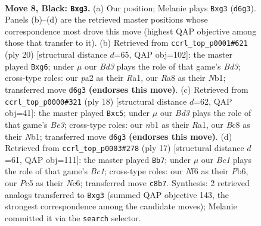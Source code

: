 \documentclass[11pt]{article}
\begin{document}
\begin{figure}[p]\centering
\begin{subfigure}{0.46\textwidth}\centering
\resizebox{\linewidth}{!}{%
\newchessgame
\chessboard[
  setfen={rnbq1rk1/p4ppp/1p1bpn2/2pp4/3P4/2PBPNB1/PP3PPP/RN1Q1RK1 b - - 0 8},
  showmover=false,
  pgfstyle=straightmove, color=movearrow, markmove={d6-g3}
]}
\caption{}
\end{subfigure}\hfill
\begin{subfigure}{0.46\textwidth}\centering
\resizebox{\linewidth}{!}{%
\newchessgame
\chessboard[
  setfen={r2q1rk1/pp1n1pp1/2pbpnbp/3p4/2PP4/1P1BPN2/PB3PPP/RN1Q1RK1 w - - 4 11},
  showmover=false,
  pgfstyle=straightmove, color=movearrow, markmove={d3-g6}
]}
\caption{}
\end{subfigure}
\\[4pt]
\begin{subfigure}{0.46\textwidth}\centering
\resizebox{\linewidth}{!}{%
\newchessgame
\chessboard[
  setfen={r1bqr1k1/1pp2ppp/2np1n2/2b1p3/p3P3/2PPBNP1/PP2QPBP/RN3RK1 w - - 1 10},
  showmover=false,
  pgfstyle=straightmove, color=movearrow, markmove={e3-c5}
]}
\caption{}
\end{subfigure}\hfill
\begin{subfigure}{0.46\textwidth}\centering
\resizebox{\linewidth}{!}{%
\newchessgame
\chessboard[
  setfen={r1bq1rk1/p4ppp/1pnbpn2/2pp4/3P4/2PBPNB1/PP1N1PPP/R2Q1RK1 b - - 1 9},
  showmover=false,
  pgfstyle=straightmove, color=movearrow, markmove={c8-b7}
]}
\caption{}
\end{subfigure}
\caption{\textbf{Move 8, Black: \texttt{Bxg3}.} (a) Our position; Melanie plays \texttt{Bxg3} (\texttt{d6g3}). Panels (b)--(d) are the retrieved master positions whose correspondence most drove this move (highest QAP objective among those that transfer to it). (b) Retrieved from \texttt{ccrl\_top\_p0001\#621} (ply 20) [structural distance $d$=65, QAP obj=102]: the master played \texttt{Bxg6}; under $\mu$ our \emph{Bd3} plays the role of that game's \emph{Bd3}; cross-type roles: our \emph{p}a2 as their \emph{R}a1, our \emph{R}a8 as their \emph{N}b1; transferred move \texttt{d6g3} \textbf{(endorses this move)}. (c) Retrieved from \texttt{ccrl\_top\_p0000\#321} (ply 18) [structural distance $d$=62, QAP obj=41]: the master played \texttt{Bxc5}; under $\mu$ our \emph{Bd3} plays the role of that game's \emph{Be3}; cross-type roles: our \emph{n}b1 as their \emph{R}a1, our \emph{B}c8 as their \emph{N}b1; transferred move \texttt{d6g3} \textbf{(endorses this move)}. (d) Retrieved from \texttt{ccrl\_top\_p0003\#278} (ply 17) [structural distance $d$=61, QAP obj=111]: the master played \texttt{Bb7}; under $\mu$ our \emph{Bc1} plays the role of that game's \emph{Bc1}; cross-type roles: our \emph{N}f6 as their \emph{P}b6, our \emph{P}c5 as their \emph{N}c6; transferred move \texttt{c8b7}. Synthesis: 2 retrieved analogs transferred to \texttt{Bxg3} (summed QAP objective 143, the strongest correspondence among the candidate moves); Melanie committed it via the \texttt{search} selector.}
\label{fig:thought-m15}
\end{figure}
\end{document}
